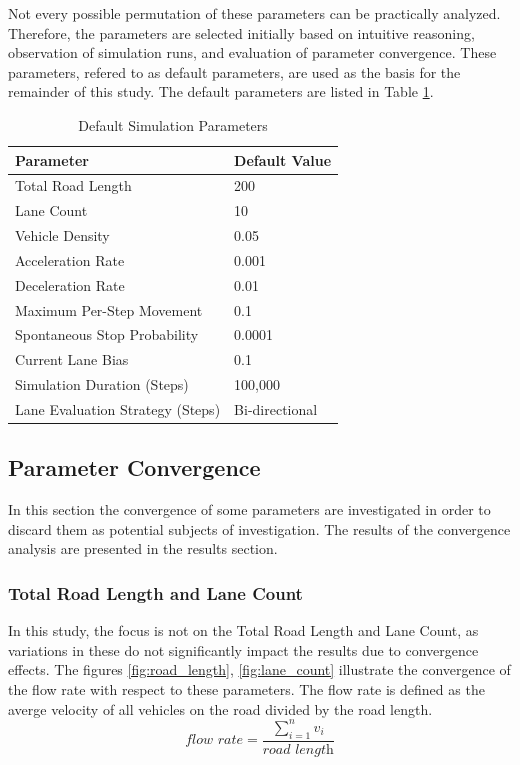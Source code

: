 \documentclass{article}
\begin{document}
Not every possible permutation of these parameters can be practically analyzed. Therefore, the parameters are selected initially based on intuitive reasoning, observation of simulation runs, and evaluation of parameter convergence. These parameters, refered to as default parameters, are used as the basis for the remainder of this study. The default parameters are listed in Table \ref{table:default_params}.
\begin{table}[H]
\centering
\begin{tabular}{|l|p{6cm}|}
\hline
\textbf{Parameter}            & \textbf{Default Value}  \\
\hline
Total Road Length             & 200 \\
\hline
Lane Count                    & 10 \\
\hline
Vehicle Density               & 0.05 \\
\hline
Acceleration Rate             & 0.001 \\
\hline
Deceleration Rate             &  0.01 \\
\hline
Maximum Per-Step Movement     &  0.1 \\
\hline
Spontaneous Stop Probability  & 0.0001 \\
\hline
Current Lane Bias             & 0.1 \\
\hline
Simulation Duration (Steps)   & 100,000 \\
\hline
Lane Evaluation Strategy (Steps)   & Bi-directional \\
\hline
\end{tabular}
\caption{Default Simulation Parameters}
\label{table:default_params}
\end{table}

\subsection{Parameter Convergence}
In this section the convergence of some parameters are investigated in order to discard them as potential subjects of investigation. The results of the convergence analysis are presented in the results section.

\subsubsection{Total Road Length and Lane Count}
In this study, the focus is not on the Total Road Length and Lane Count, as variations in these do not significantly impact the results due to convergence effects. The figures \ref{fig:road_length}, \ref{fig:lane_count} illustrate the convergence of the flow rate with respect to these parameters. The flow rate is defined as the averge velocity of all vehicles on the road divided by the road length. $$\textit{flow rate} = \frac{\sum_{i=1}^{n} v_i}{\textit{road length}}$$
\end{document}
